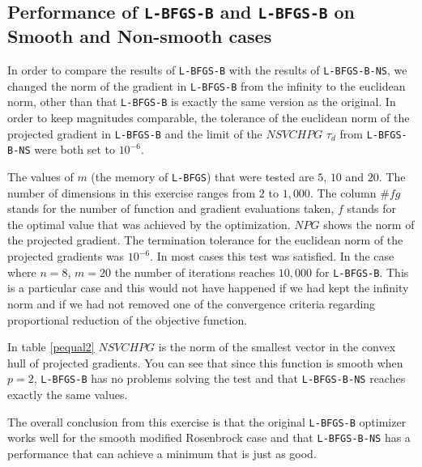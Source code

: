 \subsection{Performance of \texttt{L-BFGS-B} and  \texttt{L-BFGS-B} on Smooth and Non-smooth cases}

In order to compare the results of \texttt{L-BFGS-B} with the results of \texttt{L-BFGS-B-NS}, we changed the norm of the gradient in \texttt{L-BFGS-B} from the infinity to the euclidean norm, other than that \texttt{L-BFGS-B} is exactly the same version as the original. In order to keep magnitudes comparable, the tolerance of the euclidean norm of the projected gradient in \texttt{L-BFGS-B} and the limit of the $NSVCHPG$ $\tau_d$ from \texttt{L-BFGS-B-NS} were both set to $10^{-6}$.

The values of $m$ (the memory of \texttt{L-BFGS}) that were tested are $5$, $10$ and $20$. The number of dimensions in this exercise ranges from $2$ to $1,000$. The column $\#fg$ stands for the number of function and gradient evaluations taken, $f$ stands for the optimal value that was achieved by the optimization. $NPG$ shows the norm of the projected gradient. The termination tolerance for the euclidean norm of the projected gradients was $10^{-6}$. In most cases this test was satisfied. In the case where $n=8$, $m = 20$ the number of iterations reaches $10,000$ for \texttt{L-BFGS-B}. This is a particular case and this would not have happened if we had kept the infinity norm and if we had not removed one of the convergence criteria regarding proportional reduction of the objective function.

In table \ref{pequal2} $NSVCHPG$ is the norm of the smallest vector in the convex hull of projected gradients. You can see that since this function is smooth when $p = 2$, \texttt{L-BFGS-B} has no problems solving the test and that \texttt{L-BFGS-B-NS} reaches exactly the same values.

The overall conclusion from this exercise is that the original \texttt{L-BFGS-B} optimizer works well for the smooth modified Rosenbrock case and that \texttt{L-BFGS-B-NS} has a performance that can achieve a minimum that is just as good.


